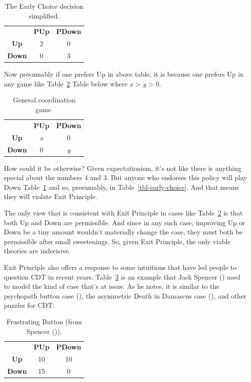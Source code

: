 \documentclass[
  12pt,
  letterpaper,
  DIV=11,
  numbers=noendperiod]{scrreprt}
\begin{document}
\begin{longtable}[]{@{}ccc@{}}
\caption{The Early Choice decision
simplified.}\label{tbl-early-choice-simplified}\tabularnewline
\toprule\noalign{}
\endfirsthead
\endhead
\bottomrule\noalign{}
\endlastfoot
& \textbf{PUp} & \textbf{PDown} \\
\textbf{Up} & 2 & 0 \\
\textbf{Down} & 0 & 3 \\
\end{longtable}

Now presumably if one prefers Up in above table, it is because one
prefers Up in any game like Table~\ref{tbl-general-coord} Table below
where \emph{x} \textgreater{} \emph{y} \textgreater{} 0.

\begin{longtable}[]{@{}ccc@{}}
\caption{General coordination
game.}\label{tbl-general-coord}\tabularnewline
\toprule\noalign{}
\endfirsthead
\endhead
\bottomrule\noalign{}
\endlastfoot
& \textbf{PUp} & \textbf{PDown} \\
\textbf{Up} & \emph{x} & 0 \\
\textbf{Down} & 0 & \emph{y} \\
\end{longtable}

How could it be otherwise? Given expectationism, it's not like there is
anything special about the numbers 4 and 3. But anyone who endorses this
policy will play Down Table~\ref{tbl-early-choice-simplified} and so,
presumably, in Table~\ref{tbl-early-choice}. And that means they will
violate Exit Principle.

The only view that is consistent with Exit Principle in cases like
Table~\ref{tbl-general-coord} is that both Up and Down are permissible.
And since in any such case, improving Up or Down be a tiny amount
wouldn't materially change the case, they must both be permissible after
small sweetenings. So, given Exit Principle, the only viable theories
are indecisive.

Exit Principle also offers a response to some intuitions that have led
people to question CDT in recent years.
Table~\ref{tbl-frustrating-button} is an example that Jack Spencer
() used to model the kind of case that's
at issue. As he notes, it is similar to the psychopath button case
(), the asymmetric Death in Damascus
case (), and other puzzles for
CDT.

\begin{longtable}[]{@{}ccc@{}}
\caption{Frustrating Button (from Spencer
()).}\label{tbl-frustrating-button}\tabularnewline
\toprule\noalign{}
\endfirsthead
\endhead
\bottomrule\noalign{}
\endlastfoot
& \textbf{PUp} & \textbf{PDown} \\
\textbf{Up} & 10 & 10 \\
\textbf{Down} & 15 & 0 \\
\end{longtable}
\end{document}
